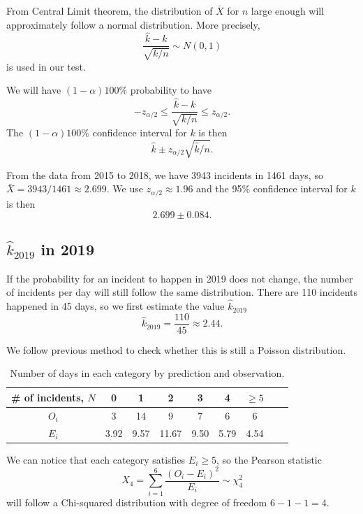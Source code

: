 \documentclass[11pt,a4paper,english]{article}
\begin{document}
From Central Limit theorem, the distribution of $\bar{X}$ for $n$ large enough will approximately follow a normal distribution. More precisely,
\begin{equation*}
	\frac{\hat{k}-k}{\sqrt{k/n}} \sim N(0,1)
\end{equation*}
is used in our test. 

We will have $(1-\alpha)100\%$ probability to have 
\begin{equation*}
	-z_{\alpha/2} \leq \frac{\hat{k}-k}{\sqrt{k/n}} \leq z_{\alpha/2}.
\end{equation*}
The $(1-\alpha)100\%$ confidence interval for $k$ is then 
\begin{equation*}
	\hat{k} \pm z_{\alpha/2}\sqrt{\hat{k}/n}.
\end{equation*}

From the data from 2015 to 2018, we have 3943 incidents in 1461 days, so $\bar{X} = 3943/1461 \approx 2.699$. We use $z_{\alpha/2} \approx 1.96$ and the 95\% confidence interval for $k$ is then 
\begin{equation*}
	2.699 \pm 0.084.
\end{equation*}

\subsection{$\hat{k}_{2019}$ in 2019}
If the probability for an incident to happen in 2019 does not change, the number of incidents per day will still follow the same distribution. There are 110 incidents happened in 45 days, so we first estimate the value $\hat{k}_{2019}$
\begin{equation*}
	\hat{k}_{2019} = \frac{110}{45} \approx 2.44.
\end{equation*}

We follow previous method to check whether this is still a Poisson distribution.
\begin{table}[htbp]
	\centering
	\begin{tabular}{c|cccccccc}
		\hline
		\# of incidents, $N$ & 0 & 1 & 2 & 3 & 4 & $\geq 5$\\
		\hline
		$O_{i}$ & 3 & 14 & 9 & 7 & 6 & 6\\
		\hline
		$E_{i}$ & 3.92 & 9.57 & 11.67 & 9.50 & 5.79 & 4.54\\
		\hline
	\end{tabular}
	\caption{Number of days in each category by prediction and observation.}
\end{table}
We can notice that each category satisfies $E_{i} \geq 5$, so the Pearson statistic 
\begin{equation*}
X_{4} = \sum_{i = 1}^{6}\frac{(O_{i}-E_{i})^{2}}{E_{i}} \sim \chi^{2}_{4}
\end{equation*}
will follow a Chi-squared distribution with degree of freedom $6-1-1 = 4$.
\end{document}
